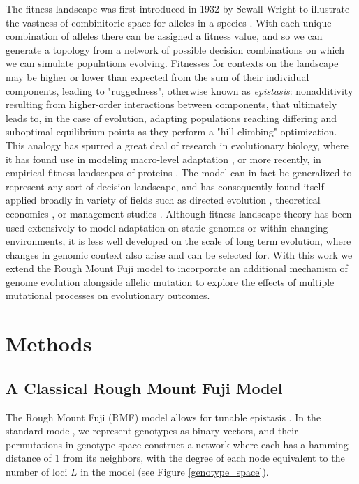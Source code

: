 \documentclass[paper=a4, fontsize=11pt,twoside]{scrartcl}       %
\begin{document}
The fitness landscape was first introduced in 1932 by Sewall Wright to illustrate the vastness of combinitoric space for alleles in a species \cite{wrightRolesMutationInbreeding}. With each unique combination of alleles there can be assigned a fitness value, and so we can generate a topology from a network of possible decision combinations on which we can simulate populations evolving. Fitnesses for contexts on the landscape may be higher or lower than expected from the sum of their individual components, leading to "ruggedness", otherwise known as \textit{epistasis}: nonadditivity resulting from higher-order interactions between components, that ultimately leads to, in the case of evolution, adapting populations reaching differing and suboptimal equilibrium points as they perform a "hill-climbing" optimization. This analogy has spurred a great deal of research in evolutionary biology, where it has found use in modeling macro-level adaptation \cite{venkataramMutualismenhancingMutationsDominate2023}\cite{frankeEvolutionaryAccessibilityMutational2011}, or more recently, in empirical fitness landscapes of proteins \cite{papkouRuggedEasilyNavigable2023}. The model can in fact be generalized to represent any sort of decision landscape, and has consequently found itself applied broadly in variety of fields such as directed evolution \cite{alpayEffectsSelectionStringency2024}, theoretical economics \cite{khraishaComplexEconomicProblems2020}, or management studies \cite{siggelkowFirmsSystemsInterdependent2011}. Although fitness landscape theory has been used extensively to model adaptation on static genomes or within changing environments, it is less well developed on the scale of long term evolution, where changes in genomic context also arise and can be selected for. With this work we extend the Rough Mount Fuji model to incorporate an additional mechanism of genome evolution alongside allelic mutation to explore the effects of multiple mutational processes on evolutionary outcomes.

\section*{Methods}

\subsection*{A Classical Rough Mount Fuji Model}

The Rough Mount Fuji (RMF) model allows for tunable epistasis \cite{neidhartAdaptationTunablyRugged2014}. In the standard model, we represent genotypes as binary vectors, and their permutations in genotype space construct a network where each has a hamming distance of 1 from its neighbors, with the degree of each node equivalent to the number of loci $L$ in the model (see Figure \ref{genotype_space}). 
\end{document}
